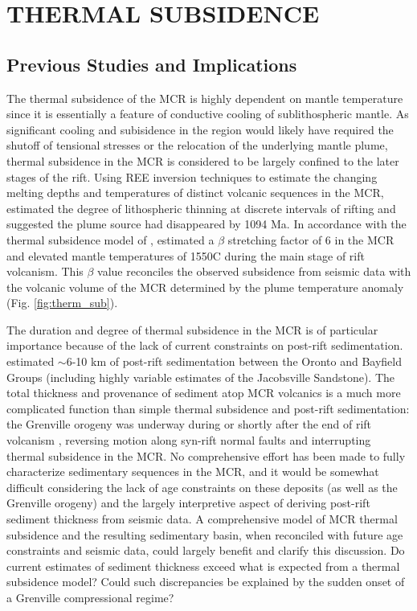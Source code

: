 \documentclass[12pt,letterpaper]{article}
\begin{document}
\section*{THERMAL SUBSIDENCE}
\subsection*{Previous Studies and Implications}
 
The thermal subsidence of the MCR is highly dependent on mantle temperature since it is essentially a feature of conductive cooling of sublithospheric mantle. As significant cooling and subisidence in the region would likely have required the shutoff of tensional stresses or the relocation of the underlying mantle plume, thermal subsidence in the MCR is considered to be largely confined to the later stages of the rift. Using REE inversion techniques to estimate the changing melting depths and temperatures of distinct volcanic sequences in the MCR, \cite{White1997a} estimated the degree of lithospheric thinning at discrete intervals of rifting and suggested the plume source had disappeared by 1094 Ma. In accordance with the thermal subsidence model of \cite{McKenzie1978a}, \cite{White1997a} estimated a $\beta$ stretching factor of 6 in the MCR and elevated mantle temperatures of 1550\textdegree C during the main stage of rift volcanism. This $\beta$ value reconciles the observed subsidence from seismic data with the volcanic volume of the MCR determined by the plume temperature anomaly (Fig. \ref{fig:therm_sub}).\par

The duration and degree of thermal subsidence in the MCR is of particular importance because of the lack of current constraints on post-rift sedimentation. \cite{Ojakangas2001a} estimated $\sim$6-10 km of post-rift sedimentation between the Oronto and Bayfield Groups (including highly variable estimates of the Jacobsville Sandstone). The total thickness and provenance of sediment atop MCR volcanics is a much more complicated function than simple thermal subsidence and post-rift sedimentation: the Grenville orogeny was underway during or shortly after the end of rift volcanism \citep{Halls2015a}, reversing motion along syn-rift normal faults and interrupting thermal subsidence in the MCR. No comprehensive effort has been made to fully characterize sedimentary sequences in the MCR, and it would be somewhat difficult considering the lack of age constraints on these deposits (as well as the Grenville orogeny) and the largely interpretive aspect of deriving post-rift sediment thickness from seismic data. A comprehensive model of MCR thermal subsidence and the resulting sedimentary basin, when reconciled with future age constraints and seismic data, could largely benefit and clarify this discussion. Do current estimates of sediment thickness exceed what is expected from a thermal subsidence model? Could such discrepancies be explained by the sudden onset of a Grenville compressional regime?
\end{document}
